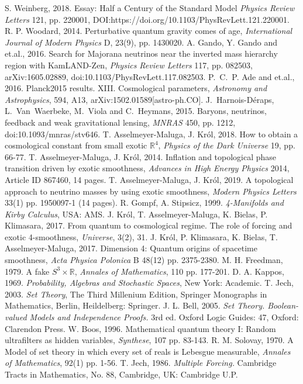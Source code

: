 \documentclass[12pt]{article}
\begin{document}
\begin{thebibliography}{99}

S. Weinberg, 2018. Essay: Half a Century of the Standard Model \emph{Physics Review Letters} 121, pp. 220001, DOI:https://doi.org/10.1103/PhysRevLett.121.220001.
 R. P. Woodard, 2014. Perturbative quantum gravity comes of age, \emph{International Journal of Modern Physics} D, 23(9), pp. 1430020.
A. Gando, Y. Gando and {et.al.}, 2016. Search for Majorana neutrinos near the inverted mass hierarchy region with KamLAND-Zen, \emph{Physics Review Letters} 117, pp. 082503, arXiv:1605.02889, doi:10.1103/PhysRevLett.117.082503.
P.~C.~P. Ade and {et.al.}, 2016. Planck2015 results. XIII. Cosmological parameters, \emph{Astronomy and Astrophysics}, 594, A13, arXiv:1502.01589[astro-ph.CO].
J.~Harnois-D{\'e}raps, L.~Van~Waerbeke, M.~Viola and C.~Heymans, 2015. Baryons, neutrinos, feedback and weak gravitational lensing, \emph{MNRAS}
450, pp. 1212, doi:10.1093/mnras/stv646.
 T. Asselmeyer-Maluga, J. Kr{\'o}l, 2018. How to obtain a cosmological constant from small exotic $\mathbb{R}^4$, {\em Physics of the Dark Universe} 19, pp. 66-77. 
 T. Asselmeyer-Maluga, J. Kr{\'o}l, 2014. Inflation and topological phase transition driven by exotic smoothness, \emph{Advances in High Energy Physics} 2014, Article ID 867460, 14 pages.
 T. Asselmeyer-Maluga, J. Kr{\'o}l, 2019. A topological approach to neutrino masses by using exotic smoothness, \emph{Modern Physics Letters} 33(1) pp. 1950097-1 (14 pages).
 R. Gompf, A. Stipsicz, 1999. \emph{4-Manifolds and Kirby Calculus}, USA: AMS. 
 J. Kr{\'o}l, T. Asselmeyer-Maluga, K. Bielas, P. Klimasara, 2017. From quantum to cosmological regime. The role of forcing  and exotic 4-smoothness, {\em Universe}, 3(2), 31.
 J. Kr\'ol, P. Klimasara, K. Bielas, T.  Asselmeyer-Maluga, 2017. Dimension 4: Quantum origins of spacetime smoothness, \emph{Acta Physica Polonica} B 48(12) pp. 2375-2380.
  M. H. Freedman, 1979. A fake $S^3\times \mathbb{R}$, {\em Annales of Mathematics},
110 pp. 177-201.
 D. A. Kappos, 1969. \emph{Probability, Algebras and Stochastic Spaces}, New York: Academic.
 T. Jech, 2003. \emph{Set Theory}, The Third Millenium Edition, Springer Monographs in Mathematics, Berlin, Heildelberg: Springer.
 J. L. Bell, 2005. \emph{Set Theory. Boolean-valued Models and Independence Proofs.} 3rd ed. Oxford Logic Guides: 47, Oxford: Clarendon Press.
 W. Boos, 1996. Mathematical quantum theory I: Random ultrafilters as hidden variables, \emph{Synthese}, 107 pp. 83-143.
 R. M. Solovay, 1970. A Model of set theory in which every set of reals is Lebesgue measurable, \emph{Annales of Mathematics}, 92(1) pp. 1-56.
 T. Jech, 1986. \emph{Multiple Forcing.} Cambridge Tracts in Mathematics, No. 88, Cambridge, UK: Cambridge U.P.
 


\end{thebibliography}
\end{document}
